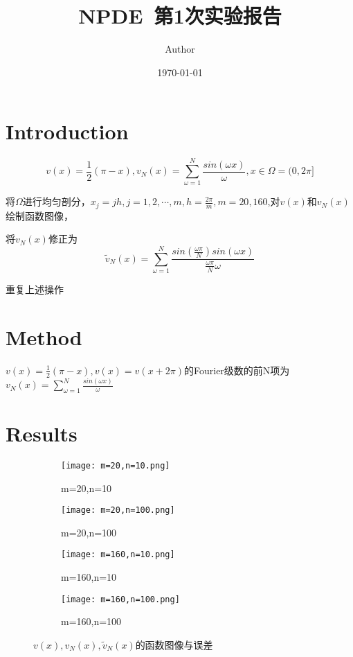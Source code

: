 \documentclass{article}
\title{NPDE~第1次实验报告}
\author{Author}
\date{\today}
\begin{document}
\maketitle

\section{Introduction}

$$v(x)=\frac{1}{2}(\pi-x),v_N(x)=\sum_{\omega =1}^{N}\frac{sin(\omega x)}{\omega},x \in \Omega=(0,2\pi]$$

将$\Omega$进行均匀剖分，$x_j=jh,j=1,2,\cdots,m,h=\frac{2\pi}{m},m=20,160$,对$v(x)$和$v_N(x)$绘制函数图像，

将$v_N(x)$修正为$$\widetilde{v}_N(x)=\sum_{\omega =1}^{N}\frac{sin(\frac{\omega \pi}{N})sin(\omega x)}{\frac{\omega \pi}{N}\omega} $$

重复上述操作

\section{Method}

$v(x)=\frac{1}{2}(\pi-x),v(x)=v(x+2\pi)$的Fourier级数的前N项为$v_N(x)=\sum_{\omega =1}^{N}\frac{sin(\omega x)}{\omega}$


\section{Results}

\begin{figure}[H]
    \centering
    \begin{subfigure}{0.35\textwidth}
        \texttt{[image: m=20,n=10.png]}
        \caption{m=20,n=10}        
    \end{subfigure}
    \begin{subfigure}{0.35\textwidth}
        \texttt{[image: m=20,n=100.png]}
        \caption{m=20,n=100}
    \end{subfigure}
    \begin{subfigure}{0.35\textwidth}
        \texttt{[image: m=160,n=10.png]}
        \caption{m=160,n=10}
    \end{subfigure}
    \begin{subfigure}{0.35\textwidth}
        \texttt{[image: m=160,n=100.png]}
        \caption{m=160,n=100}
    \end{subfigure}
    \caption{$v(x),v_N(x),\widetilde{v}_N(x)$的函数图像与误差}
\end{figure}
\end{document}
